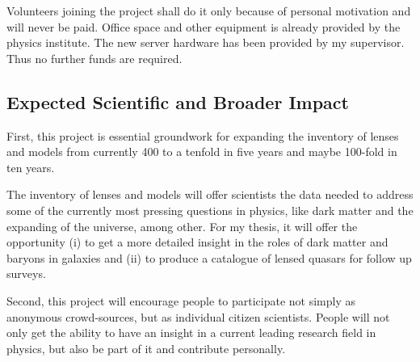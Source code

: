 \documentclass[11pt]{article}
\begin{document}
Volunteers joining the project shall do it only because of personal motivation and will never be paid.
Office space and other equipment is already provided by the physics institute.
The new server hardware has been provided by my supervisor.
Thus no further funds are required.





\subsection{Expected Scientific and Broader Impact}

First, this project is essential groundwork for expanding the inventory of lenses and models from currently 400 to a tenfold in five years and maybe 100-fold in ten years.

The inventory of lenses and models will offer scientists the data needed to address some of the currently most pressing questions in physics, like dark matter and the expanding of the universe, among other.
For my thesis, it will offer the opportunity (i) to get a more detailed insight in the roles of dark matter and baryons in galaxies and (ii) to produce a catalogue of lensed quasars for follow up surveys.



Second, this project will encourage people to participate not simply as anonymous crowd-sources, but as individual citizen scientists.
People will not only get the ability to have an insight in a current leading research field in physics, but also be part of it and contribute personally.


\newpage


\end{document}
